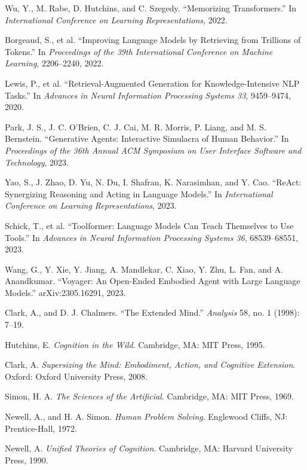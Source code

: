 \documentclass[11pt]{article}
\begin{document}
Wu, Y., M. Rabe, D. Hutchins, and C. Szegedy.
``Memorizing Transformers.''
In \textit{International Conference on Learning Representations}, 2022.

Borgeaud, S., et al.
``Improving Language Models by Retrieving from Trillions of Tokens.''
In \textit{Proceedings of the 39th International Conference on
Machine Learning}, 2206--2240, 2022.

Lewis, P., et al.
``Retrieval-Augmented Generation for Knowledge-Intensive NLP Tasks.''
In \textit{Advances in Neural Information Processing Systems 33},
9459--9474, 2020.

Park, J. S., J. C. O'Brien, C. J. Cai, M. R. Morris,
P. Liang, and M. S. Bernstein.
``Generative Agents: Interactive Simulacra of Human Behavior.''
In \textit{Proceedings of the 36th Annual ACM Symposium on User
Interface Software and Technology}, 2023.

Yao, S., J. Zhao, D. Yu, N. Du, I. Shafran, K. Narasimhan,
and Y. Cao.
``ReAct: Synergizing Reasoning and Acting in Language Models.''
In \textit{International Conference on Learning Representations}, 2023.

Schick, T., et al.
``Toolformer: Language Models Can Teach Themselves to Use Tools.''
In \textit{Advances in Neural Information Processing Systems 36},
68539--68551, 2023.

Wang, G., Y. Xie, Y. Jiang, A. Mandlekar, C. Xiao,
Y. Zhu, L. Fan, and A. Anandkumar.
``Voyager: An Open-Ended Embodied Agent with Large Language Models.''
arXiv:2305.16291, 2023.

Clark, A., and D. J. Chalmers.
``The Extended Mind.''
\textit{Analysis} 58, no. 1 (1998): 7--19.

Hutchins, E.
\textit{Cognition in the Wild}.
Cambridge, MA: MIT Press, 1995.

Clark, A.
\textit{Supersizing the Mind: Embodiment, Action, and Cognitive Extension}.
Oxford: Oxford University Press, 2008.

Simon, H. A.
\textit{The Sciences of the Artificial}.
Cambridge, MA: MIT Press, 1969.

Newell, A., and H. A. Simon.
\textit{Human Problem Solving}.
Englewood Cliffs, NJ: Prentice-Hall, 1972.

Newell, A.
\textit{Unified Theories of Cognition}.
Cambridge, MA: Harvard University Press, 1990.
\end{document}
